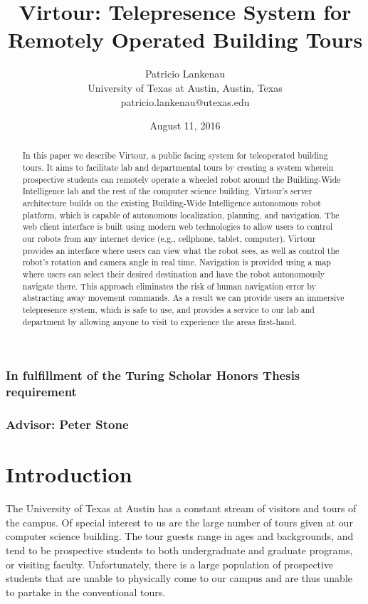 \documentclass[
  oneside,
  11pt, a4paper,
  footinclude=true,
  headinclude=true,
  cleardoublepage=empty
]{article}
\title{Virtour: Telepresence System for Remotely Operated Building Tours}
\author{Patricio Lankenau\\
        University of Texas at Austin, Austin, Texas\\
        patricio.lankenau@utexas.edu\\}
\date{August 11, 2016}
\begin{document}
\maketitle

\begin{abstract}
  In this paper we describe Virtour, a public facing system for teleoperated
  building tours. It aims to facilitate lab and departmental tours by creating
  a system wherein prospective students can remotely operate a wheeled robot
  around the Building-Wide Intelligence lab and the rest of the computer
  science building. Virtour's server architecture builds on the existing
  Building-Wide Intelligence autonomous robot platform, which is capable of
  autonomous localization, planning, and navigation. The web client interface
  is built using modern web technologies to allow users to control our robots
  from any internet device (e.g., cellphone, tablet, computer). Virtour
  provides an interface where users can view what the robot sees, as well as
  control the robot's rotation and camera angle in real time. Navigation is
  provided using a map where users can select their desired destination and
  have the robot autonomously navigate there. This approach eliminates the risk
  of human navigation error by abstracting away movement commands. As a result
  we can provide users an immersive telepresence system, which is safe to use,
  and provides a service to our lab and department by allowing anyone to visit
  to experience the areas first-hand.
\end{abstract}

\vfill

\subsubsection*{\centering In fulfillment of the Turing Scholar Honors Thesis
requirement}

\subsubsection*{\centering Advisor: Peter Stone}

\newpage

\section{Introduction}\label{sec:intro}

The University of Texas at Austin has a constant stream of visitors and tours
of the campus. Of special interest to us are the large number of tours given at
our computer science building. The tour guests range in ages and backgrounds,
and tend to be prospective students to both undergraduate and graduate programs,
or visiting faculty. Unfortunately, there is a large population of prospective
students that are unable to physically come to our campus and are thus unable
to partake in the conventional tours.
\end{document}
